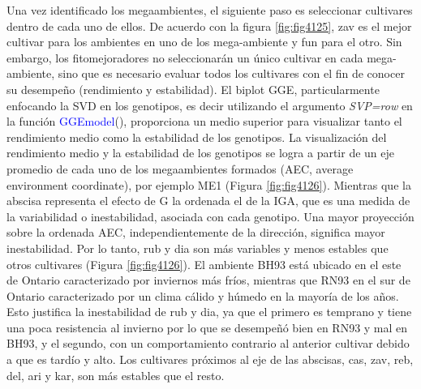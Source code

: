 Una vez identificado los megaambientes, el siguiente paso es seleccionar cultivares dentro de cada uno de ellos. De acuerdo con la figura  \ref{fig:fig4125}, zav es el mejor cultivar para los ambientes en uno de los mega-ambiente y fun para el otro. Sin embargo, los fitomejoradores no seleccionarán un único cultivar en cada mega-ambiente, sino que es necesario evaluar todos los cultivares con el fin de conocer su desempeño (rendimiento y estabilidad).
El biplot GGE, particularmente enfocando la SVD en los genotipos, es decir utilizando el argumento \emph{SVP=row} en la función \textcolor{blue}{GGEmodel}(), proporciona un medio superior para visualizar tanto el rendimiento medio como la estabilidad de los genotipos. La visualización del rendimiento medio y la estabilidad de los genotipos se logra a partir de un eje promedio de cada uno de los megaambientes formados (AEC, average environment coordinate), por ejemplo ME1 (Figura \ref{fig:fig4126}). Mientras que la abscisa representa el efecto de G la ordenada el de la IGA, que es una medida de la variabilidad o inestabilidad, asociada con cada genotipo. Una mayor proyección sobre la ordenada AEC, independientemente de la dirección, significa mayor inestabilidad. Por lo tanto, rub y dia son más variables y menos estables que otros cultivares (Figura \ref{fig:fig4126}). El ambiente BH93 está ubicado en el este de Ontario caracterizado por inviernos más fríos, mientras que RN93 en el sur de Ontario caracterizado por un clima cálido y húmedo en la mayoría de los años. Esto justifica la inestabilidad de rub y dia, ya que el primero es temprano y tiene una poca resistencia al invierno por lo que se desempeñó bien en RN93 y mal en BH93, y el segundo, con un comportamiento contrario al anterior cultivar debido a que es tardío y alto. Los cultivares próximos al eje de las abscisas, cas, zav, reb, del, ari y kar, son más estables que el resto. 

